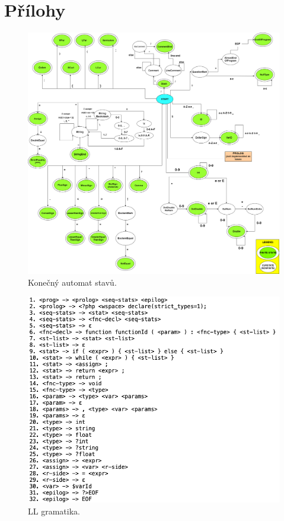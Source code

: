 \documentclass[a4paper, 12pt]{article}
\begin{document}
    \section{Přílohy}
    \begin{figure}[h]
    \hspace*{-1cm}
        \includegraphics[width=0.85\paperwidth]{src/definitiveStateMachine_finall.png}
        \caption{Konečný automat stavů.}
        \label{Konecny automat}
    \end{figure}

    \begin{figure}[h]
        \includegraphics[width=0.65\paperwidth]{src/LL-gramatika.png}
        \caption{LL gramatika.}
        \label{LL gramatika}
    \end{figure}
\end{document}
